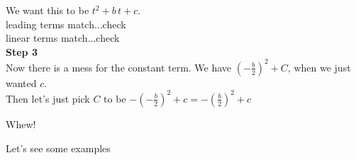 \documentclass{ximera}
\begin{document}
We want this to be $t^2 + b \, t + c$. \\

leading terms match...check \\
linear terms match...check \\


\textbf{\textcolor{blue!75!black}{Step 3}} \\


Now there is a mess for the constant term.  We have $\left( -\frac{b}{2}\right )^2 + C$, when we just wanted $c$.  \\

Then let's just pick $C$ to be $-\left( -\frac{b}{2}\right )^2 + c = -\left(\frac{b}{2}\right)^2 + c$



Whew!

Let's see some examples
\end{document}
